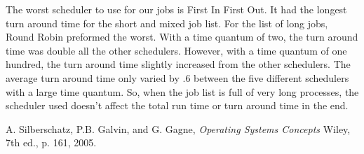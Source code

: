 \documentclass[conference,11pt]{IEEEtran}
\begin{document}
The worst scheduler to use for our jobs is First In First Out. It had the longest turn around time for the short and mixed job list. For the list of long jobs, Round Robin preformed the worst. With a time quantum of two, the turn around time was double all the other schedulers. However, with a time quantum of one hundred, the turn around time slightly increased from the other schedulers. The average turn around time only varied by .6 between the five different schedulers with a large time quantum. So, when the job list is full of very long processes, the scheduler used doesn't affect the total run time or turn around time in the end.


\begin{thebibliography}{3}
A. Silberschatz, P.B. Galvin, and G. Gagne,
\textit{Operating Systems Concepts}
Wiley, 7th ed., p. 161, 2005.
\end{thebibliography}
\end{document}
